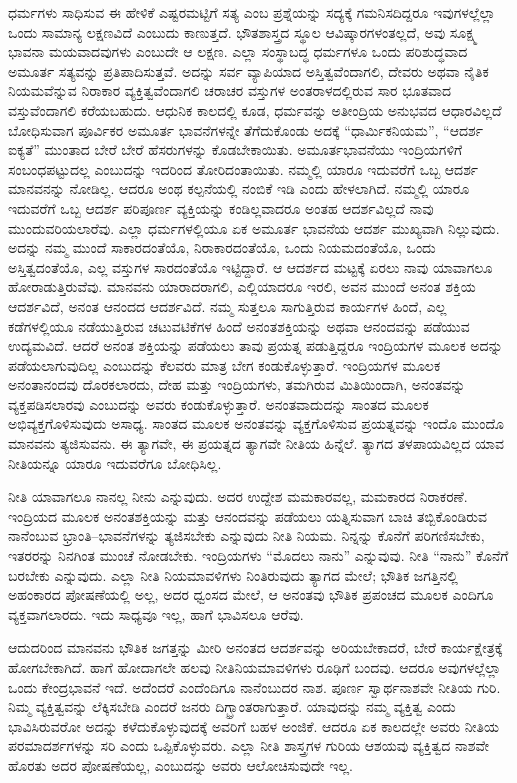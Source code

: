 ಧರ್ಮಗಳು ಸಾಧಿಸುವ ಈ ಹೇಳಿಕೆ ಎಷ್ಟರಮಟ್ಟಿಗೆ ಸತ್ಯ ಎಂಬ ಪ್ರಶ್ನೆಯನ್ನು ಸದ್ಯಕ್ಕೆ ಗಮನಿಸದಿದ್ದರೂ ಇವುಗಳಲ್ಲೆಲ್ಲಾ ಒಂದು ಸಾಮಾನ್ಯ ಲಕ್ಷಣವಿದೆ ಎಂಬುದು ಕಾಣುತ್ತದೆ. ಭೌತಶಾಸ್ತ್ರದ ಸ್ಥೂಲ ಆವಿಷ್ಕಾರಗಳಂತಲ್ಲದೆ, ಅವು ಸೂಕ್ಷ್ಮ ಭಾವನಾ ಮಯವಾದವುಗಳು ಎಂಬುದೇ ಆ ಲಕ್ಷಣ. ಎಲ್ಲಾ ಸಂಸ್ಥಾಬದ್ಧ ಧರ್ಮಗಳೂ ಒಂದು ಪರಿಶುದ್ಧವಾದ ಅಮೂರ್ತ ಸತ್ಯವನ್ನು ಪ್ರತಿಪಾದಿಸುತ್ತವೆ. ಅದನ್ನು ಸರ್ವ ವ್ಯಾಪಿಯಾದ ಅಸ್ತಿತ್ವವೆಂದಾಗಲಿ, ದೇವರು ಅಥವಾ ನೈತಿಕ ನಿಯಮವೆನ್ನುವ ನಿರಾಕಾರ ವ್ಯಕ್ತಿತ್ವವೆಂದಾಗಲಿ ಚರಾಚರ ವಸ್ತುಗಳ ಅಂತರಾಳದಲ್ಲಿರುವ ಸಾರ ಭೂತವಾದ ವಸ್ತುವೆಂದಾಗಲಿ ಕರೆಯಬಹುದು. ಆಧುನಿಕ ಕಾಲದಲ್ಲಿ ಕೂಡ, ಧರ್ಮವನ್ನು ಅತೀಂದ್ರಿಯ ಅನುಭವದ ಆಧಾರವಿಲ್ಲದೆ ಬೋಧಿಸುವಾಗ ಪೂರ್ವಿಕರ ಅಮೂರ್ತ ಭಾವನೆಗಳನ್ನೇ ತೆಗೆದುಕೊಂಡು ಅದಕ್ಕೆ “ಧಾರ್ಮಿಕನಿಯಮ”, “ಆದರ್ಶ ಐಕ್ಯತೆ” ಮುಂತಾದ ಬೇರೆ ಬೇರೆ ಹೆಸರುಗಳನ್ನು ಕೊಡಬೇಕಾಯಿತು. ಅಮೂರ್ತಭಾವನೆಯು ಇಂದ್ರಿಯಗಳಿಗೆ ಸಂಬಂಧಪಟ್ಟುದಲ್ಲ ಎಂಬುದನ್ನು ಇದರಿಂದ ತೋರಿದಂತಾಯಿತು. ನಮ್ಮಲ್ಲಿ ಯಾರೂ ಇದುವರೆಗೆ ಒಬ್ಬ ಆದರ್ಶ ಮಾನವನನ್ನು ನೋಡಿಲ್ಲ. ಆದರೂ ಅಂಥ ಕಲ್ಪನೆಯಲ್ಲಿ ನಂಬಿಕೆ ಇಡಿ ಎಂದು ಹೇಳಲಾಗಿದೆ. ನಮ್ಮಲ್ಲಿ ಯಾರೂ ಇದುವರೆಗೆ ಒಬ್ಬ ಆದರ್ಶ ಪರಿಪೂರ್ಣ ವ್ಯಕ್ತಿಯನ್ನು ಕಂಡಿಲ್ಲವಾದರೂ ಅಂತಹ ಆದರ್ಶವಿಲ್ಲದೆ ನಾವು ಮುಂದುವರಿಯಲಾರೆವು. ಎಲ್ಲಾ ಧರ್ಮಗಳಲ್ಲಿಯೂ ಏಕ ಅಮೂರ್ತ ಭಾವನೆಯ ಆದರ್ಶ ಮುಖ್ಯವಾಗಿ ನಿಲ್ಲುವುದು. ಅದನ್ನು ನಮ್ಮ ಮುಂದೆ ಸಾಕಾರದಂತೆಯೊ, ನಿರಾಕಾರದಂತೆಯೊ, ಒಂದು ನಿಯಮದಂತೆಯೊ, ಒಂದು ಅಸ್ತಿತ್ವದಂತೆಯೊ, ಎಲ್ಲ ವಸ್ತುಗಳ ಸಾರದಂತೆಯೊ ಇಟ್ಟಿದ್ದಾರೆ. ಆ ಆದರ್ಶದ ಮಟ್ಟಕ್ಕೆ ಏರಲು ನಾವು ಯಾವಾಗಲೂ ಹೋರಾಡುತ್ತಿರುವೆವು. ಮಾನವನು ಯಾರಾದರಾಗಲಿ, ಎಲ್ಲಿಯಾದರೂ ಇರಲಿ, ಅವನ ಮುಂದೆ ಅನಂತ ಶಕ್ತಿಯ ಆದರ್ಶವಿದೆ, ಅನಂತ ಆನಂದದ ಆದರ್ಶವಿದೆ. ನಮ್ಮ ಸುತ್ತಲೂ ಸಾಗುತ್ತಿರುವ ಕಾರ್ಯಗಳ ಹಿಂದೆ, ಎಲ್ಲ ಕಡೆಗಳಲ್ಲಿಯೂ ನಡೆಯುತ್ತಿರುವ ಚಟುವಟಿಕೆಗಳ ಹಿಂದೆ ಅನಂತಶಕ್ತಿಯನ್ನು ಅಥವಾ ಆನಂದವನ್ನು ಪಡೆಯುವ ಉದ್ಯಮವಿದೆ. ಆದರೆ ಅನಂತ ಶಕ್ತಿಯನ್ನು ಪಡೆಯಲು ತಾವು ಪ್ರಯತ್ನ ಪಡುತ್ತಿದ್ದರೂ ಇಂದ್ರಿಯಗಳ ಮೂಲಕ ಅದನ್ನು ಪಡೆಯಲಾಗುವುದಿಲ್ಲ ಎಂಬುದನ್ನು ಕೆಲವರು ಮಾತ್ರ ಬೇಗ ಕಂಡುಕೊಳ್ಳುತ್ತಾರೆ. ಇಂದ್ರಿಯಗಳ ಮೂಲಕ ಅನಂತಾನಂದವು ದೊರಕಲಾರದು, ದೇಹ ಮತ್ತು ಇಂದ್ರಿಯಗಳು, ತಮಗಿರುವ ಮಿತಿಯಿಂದಾಗಿ, ಅನಂತವನ್ನು ವ್ಯಕ್ತಪಡಿಸಲಾರವು ಎಂಬುದನ್ನು ಅವರು ಕಂಡುಕೊಳ್ಳುತ್ತಾರೆ. ಅನಂತವಾದುದನ್ನು ಸಾಂತದ ಮೂಲಕ ಅಭಿವ್ಯಕ್ತಗೊಳಿಸುವುದು ಅಸಾಧ್ಯ. ಸಾಂತದ ಮೂಲಕ ಅನಂತವನ್ನು ವ್ಯಕ್ತಗೊಳಿಸುವ ಪ್ರಯತ್ನವನ್ನು ಇಂದೊ ಮುಂದೊ ಮಾನವನು ತ್ಯಜಿಸುವನು. ಈ ತ್ಯಾಗವೇ, ಈ ಪ್ರಯತ್ನದ ತ್ಯಾಗವೇ ನೀತಿಯ ಹಿನ್ನೆಲೆ. ತ್ಯಾಗದ ತಳಪಾಯವಿಲ್ಲದ ಯಾವ ನೀತಿಯನ್ನೂ ಯಾರೂ ಇದುವರೆಗೂ ಬೋಧಿಸಿಲ್ಲ.

ನೀತಿ ಯಾವಾಗಲೂ ನಾನಲ್ಲ ನೀನು ಎನ್ನುವುದು. ಅದರ ಉದ್ದೇಶ ಮಮಕಾರವಲ್ಲ, ಮಮಕಾರದ ನಿರಾಕರಣೆ. ಇಂದ್ರಿಯದ ಮೂಲಕ ಅನಂತಶಕ್ತಿಯನ್ನು ಮತ್ತು ಆನಂದವನ್ನು ಪಡೆಯಲು ಯತ್ನಿಸುವಾಗ ಬಾಚಿ ತಬ್ಬಿಕೊಂಡಿರುವ ನಾನೆಂಬುವ ಭ್ರಾಂತಿ–ಭಾವನೆಗಳನ್ನು ತ್ಯಜಿಸಬೇಕು ಎನ್ನುವುದು ನೀತಿ ನಿಯಮ. ನಿನ್ನನ್ನು ಕೊನೆಗೆ ಪರಿಗಣಿಸಬೇಕು, ಇತರರನ್ನು ನಿನಗಿಂತ ಮುಂಚೆ ನೋಡಬೇಕು. ಇಂದ್ರಿಯಗಳು “ಮೊದಲು ನಾನು” ಎನ್ನುವುವು. ನೀತಿ “ನಾನು” ಕೊನೆಗೆ ಬರಬೇಕು ಎನ್ನುವುದು. ಎಲ್ಲಾ ನೀತಿ ನಿಯಮಾವಳಿಗಳು ನಿಂತಿರುವುದು ತ್ಯಾಗದ ಮೇಲೆ; ಭೌತಿಕ ಜಗತ್ತಿನಲ್ಲಿ ಅಹಂಕಾರದ ಪೋಷಣೆಯಲ್ಲಿ ಅಲ್ಲ, ಅದರ ಧ್ವಂಸದ ಮೇಲೆ, ಆ ಅನಂತವು ಭೌತಿಕ ಪ್ರಪಂಚದ ಮೂಲಕ ಎಂದಿಗೂ ವ್ಯಕ್ತವಾಗಲಾರದು. ಇದು ಸಾಧ್ಯವೂ ಇಲ್ಲ, ಹಾಗೆ ಭಾವಿಸಲೂ ಆರೆವು.

ಆದುದರಿಂದ ಮಾನವನು ಭೌತಿಕ ಜಗತ್ತನ್ನು ಮೀರಿ ಅನಂತದ ಆದರ್ಶವನ್ನು ಅರಿಯಬೇಕಾದರೆ, ಬೇರೆ ಕಾರ್ಯಕ್ಷೇತ್ರಕ್ಕೆ ಹೋಗಬೇಕಾಗಿದೆ. ಹಾಗೆ ಹೋದಾಗಲೇ ಹಲವು ನೀತಿನಿಯಮಾವಳಿಗಳು ರೂಢಿಗೆ ಬಂದವು. ಆದರೂ ಅವುಗಳಲ್ಲೆಲ್ಲಾ ಒಂದು ಕೇಂದ್ರಭಾವನೆ ಇದೆ. ಅದೆಂದರೆ ಎಂದೆಂದಿಗೂ ನಾನೆಂಬುದರ ನಾಶ. ಪೂರ್ಣ ಸ್ವಾರ್ಥನಾಶವೇ ನೀತಿಯ ಗುರಿ. ನಿಮ್ಮ ವ್ಯಕ್ತಿತ್ವವನ್ನು ಲೆಕ್ಕಿಸಬೇಡಿ ಎಂದರೆ ಜನರು ದಿಗ್ಭ್ರಾಂತರಾಗುತ್ತಾರೆ. ಯಾವುದನ್ನು ನಮ್ಮ ವ್ಯಕ್ತಿತ್ವ ಎಂದು ಭಾವಿಸಿರುವರೋ ಅದನ್ನು ಕಳೆದುಕೊಳ್ಳುವುದಕ್ಕೆ ಅವರಿಗೆ ಬಹಳ ಅಂಜಿಕೆ. ಆದರೂ ಏಕ ಕಾಲದಲ್ಲೇ ಅವರು ನೀತಿಯ ಪರಮಾದರ್ಶಗಳನ್ನು ಸರಿ ಎಂದು ಒಪ್ಪಿಕೊಳ್ಳುವರು. ಎಲ್ಲಾ ನೀತಿ ಶಾಸ್ತ್ರಗಳ ಗುರಿಯ ಆಶಯವು ವ್ಯಕ್ತಿತ್ವದ ನಾಶವೇ ಹೊರತು ಅದರ ಪೋಷಣೆಯಲ್ಲ, ಎಂಬುದನ್ನು ಅವರು ಆಲೋಚಿಸುವುದೇ ಇಲ್ಲ.

